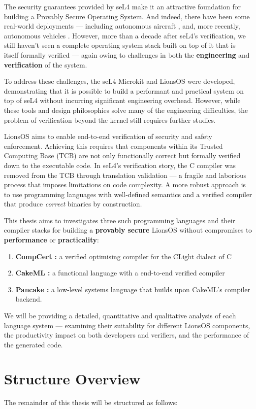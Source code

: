 The security guarantees provided by seL4 make it an attractive foundation for building a Provably Secure Operating System. And indeed, there have been some real-world deployments --- including autonomous aircraft \citep{Cofer_GBWPFPKKAHS_18}, and, more recently, autonomous vehicles \citep{Qu_24:sel4s}. However, more than a decade after seL4’s verification, we still haven’t seen a complete operating system stack built on top of it that is itself formally verified --- again owing to challenges in both the \textbf{engineering} and \textbf{verification} of the system.

To address these challenges, the seL4 Microkit \citep{microkit:url} and LionsOS \citep{heiser2025lionsos} were developed, demonstrating that it is possible to build a performant and practical system on top of seL4 without incurring significant engineering overhead. However, while these tools and design philosophies solve many of the engineering difficulties, the problem of verification beyond the kernel still requires further studies.

LionsOS aims to enable end-to-end verification of security and safety enforcement. Achieving this requires that components within its Trusted Computing Base (TCB) are not only functionally correct but formally verified down to the executable code. In seL4's verification story, the C compiler was removed from the TCB through translation validation \citep{sewell2013TV} --- a fragile and laborious process that imposes limitations on code complexity. A more robust approach is to use programming languages with well-defined semantics and a verified compiler that produce \emph{correct} binaries by construction.

This thesis aims to investigates three such programming languages and their compiler stacks for building a \textbf{provably secure} LionsOS without compromises to \textbf{performance} or \textbf{practicality}:
\begin{enumerate}
    \item \textbf{CompCert \citep{leroy2009compcert}:} a verified optimising compiler for the CLight dialect of C
    \item \textbf{CakeML \citep{kumar2014cakeml}:} a functional language with a end-to-end verified compiler
    \item \textbf{Pancake \citep{Pohjola2023pancake}:} a low-level systems language that builds upon CakeML's compiler backend.
\end{enumerate}

We will be providing a detailed, quantitative and qualitative analysis of each language system --- examining their suitability for different LionsOS components, the productivity impact on both developers and verifiers, and the performance of the generated code.

\section*{Structure Overview}
The remainder of this thesis will be structured as follows:

